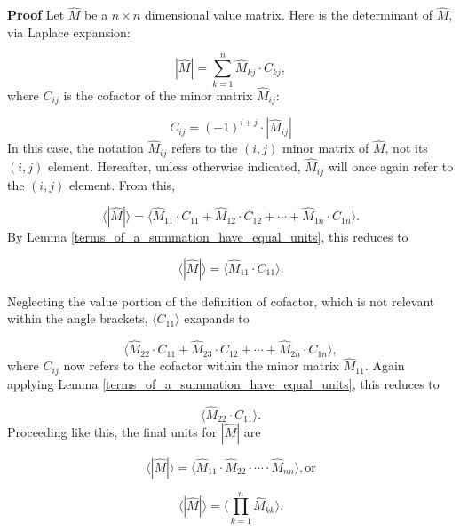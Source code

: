 \documentclass[10pt,letterpaper]{article}
\newenvironment{proof}{\noindent\textbf{Proof} }{\qed \newline}
\newcommand{\qed}{\nobreak \ifvmode \relax \else
      \ifdim\lastskip<1.5em \hskip-\lastskip
      \hskip1.5em plus0em minus0.5em \fi \nobreak
      \vrule height0.75em width0.5em depth0.25em\fi}
\numberwithin{equation}{section}
\begin{document}
\begin{proof}Let $\hat M$ be a $n \times n$ dimensional value matrix.
  Here is the determinant of $\hat M$, via Laplace expansion:

\[ | \hat M | = \sum_{k=1}^n \hat M_{kj} \cdot C_{kj} , \] where $C_{ij}$ is the
cofactor of the minor matrix $\hat M_{ij}$:

\[ C_{ij} = (-1)^{i + j} \cdot | \hat M_{ij} | \] In this case, the
notation $\hat M_{ij}$ refers to the $(i, j)$ minor matrix of $\hat
M$, not its $(i, j)$ element. Hereafter, unless otherwise indicated,
$\hat M_{ij}$ will once again refer to the $(i, j)$ element.  From
this,

\[ \langle | \hat M | \rangle = \langle \hat M_{11} \cdot C_{11} +
\hat M_{12} \cdot C_{12} + \cdots + \hat M_{1n} \cdot C_{1n}\rangle
. \] By Lemma \ref{terms_of_a_summation_have_equal_units}, this
reduces to

\[ \langle | \hat M | \rangle = \langle \hat M_{11} \cdot C_{11}
\rangle . \]

Neglecting the value portion of the definition of cofactor, which is
not relevant within the angle brackets, $\langle C_{11} \rangle$
exapands to

\[ \langle \hat M_{22} \cdot C_{11} + \hat M_{23} \cdot C_{12} +
\cdots + \hat M_{2n} \cdot C_{1n} \rangle , \] where $C_{ij}$ now
refers to the cofactor within the minor matrix $\hat M_{11}$.  Again
applying Lemma \ref{terms_of_a_summation_have_equal_units}, this
reduces to

\[ \langle \hat M_{22} \cdot C_{11} \rangle . \]  Proceeding like
this, the final units for $| \hat M |$ are

\[ \langle | \hat M | \rangle = \langle \hat M_{11} \cdot \hat M_{22}
\cdot \cdots \cdot \hat M_{nn} \rangle , \mbox{or} \]

\[ \langle | \hat M | \rangle = \langle \prod_{k=1}^n \hat M_{kk}
\rangle . \] \end{proof}
\end{document}

